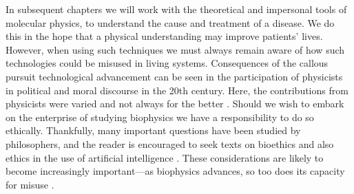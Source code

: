 In subsequent chapters we will work with the theoretical and impersonal tools of molecular physics, to understand the cause and treatment of a disease. We do this in the hope that a physical understanding may improve patients' lives. However, when using such techniques we must always remain aware of how such technologies could be misused in living systems. Consequences of the callous pursuit technological advancement can be seen in the participation of physicists in political and moral discourse in the 20th century. Here, the contributions from physicists were varied and not always for the better \cite{frank1993, gottfried1999, global2009, rhodes1986, aaronson2008, berger2016, vonneumann_britanica}. Should we wish to embark on the enterprise of studying biophysics we have a responsibility to do so ethically. Thankfully, many important questions have been studied by philosophers, and the reader is encouraged to seek texts on bioethics and also ethics in the use of artificial intelligence \cite{buchanan2000, taneri2011, genome_editting_guildelines_2017, muller2021, bostrom2014, roose2022}. These considerations are likely to become increasingly important---as biophysics advances, so too does its capacity for misuse \cite{mallapaty2022, urbina2022}. 



